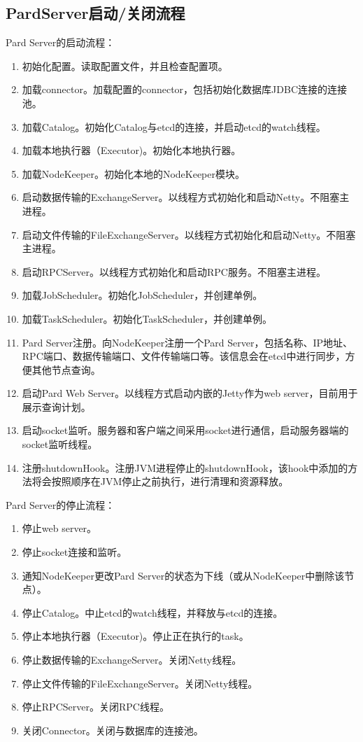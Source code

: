 \documentclass[a4paper, 12pt]{ctexart}
\begin{document}
\subsection{PardServer启动/关闭流程}
Pard Server的启动流程：
\begin{enumerate}
\item 初始化配置。读取配置文件，并且检查配置项。
\item 加载connector。加载配置的connector，包括初始化数据库JDBC连接的连接池。
\item 加载Catalog。初始化Catalog与etcd的连接，并启动etcd的watch线程。
\item 加载本地执行器（Executor)。初始化本地执行器。
\item 加载NodeKeeper。初始化本地的NodeKeeper模块。
\item 启动数据传输的ExchangeServer。以线程方式初始化和启动Netty。不阻塞主进程。
\item 启动文件传输的FileExchangeServer。以线程方式初始化和启动Netty。不阻塞主进程。
\item 启动RPCServer。以线程方式初始化和启动RPC服务。不阻塞主进程。
\item 加载JobScheduler。初始化JobScheduler，并创建单例。
\item 加载TaskScheduler。初始化TaskScheduler，并创建单例。
\item Pard Server注册。向NodeKeeper注册一个Pard Server，包括名称、IP地址、RPC端口、数据传输端口、文件传输端口等。该信息会在etcd中进行同步，方便其他节点查询。
\item 启动Pard Web Server。以线程方式启动内嵌的Jetty作为web server，目前用于展示查询计划。
\item 启动socket监听。服务器和客户端之间采用socket进行通信，启动服务器端的socket监听线程。
\item 注册shutdownHook。注册JVM进程停止的shutdownHook，该hook中添加的方法将会按照顺序在JVM停止之前执行，进行清理和资源释放。
\end{enumerate}

Pard Server的停止流程：
\begin{enumerate}
\item 停止web server。
\item 停止socket连接和监听。
\item 通知NodeKeeper更改Pard Server的状态为下线（或从NodeKeeper中删除该节点）。
\item 停止Catalog。中止etcd的watch线程，并释放与etcd的连接。
\item 停止本地执行器（Executor)。停止正在执行的task。
\item 停止数据传输的ExchangeServer。关闭Netty线程。
\item 停止文件传输的FileExchangeServer。关闭Netty线程。
\item 停止RPCServer。关闭RPC线程。
\item 关闭Connector。关闭与数据库的连接池。
\end{enumerate}
\end{document}
